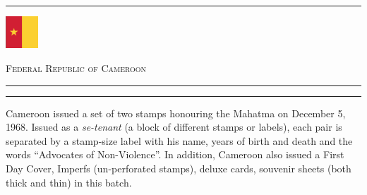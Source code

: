 \documentclass[a4paper]{article}
\begin{document}
\begin{landscape}
  \hrule
  \vspace{8pt}
  \begin{minipage}{5cm}
    \includegraphics[height=1.2cm]{images/cm}
  \end{minipage}
  \hfill
  {\scshape\Huge Federal Republic of Cameroon}
  \vspace{8pt}
  \hrule
  \vspace{11.5cm}
  \begin{center}
    \begin{minipage}{17cm}
      \hrule \vspace{12pt} Cameroon issued a set of two stamps honouring
      the Mahatma on December 5, 1968. Issued as a {\it se-tenant} (a
      block of different stamps or labels), each pair is separated by a
      stamp-size label with his name, years of birth and death and the
      words ``Advocates of Non-Violence''. In addition, Cameroon also
      issued a First Day Cover, Imperfs (un-perforated stamps), deluxe
      cards, souvenir sheets (both thick and thin) in this batch.
    \end{minipage}
  \end{center}
\end{landscape}
\end{document}
